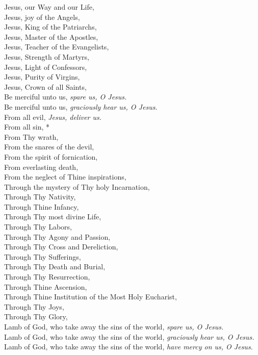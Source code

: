 \documentclass{article}
\begin{document}
\begin{multicols}{3}
Jesus, our Way and our Life,\\ 
Jesus, joy of the Angels,\\
Jesus, King of the Patriarchs,\\ 
Jesus, Master of the Apostles,\\
Jesus, Teacher of the Evangelists,\\ 
Jesus, Strength of Martyrs,\\
Jesus, Light of Confessors,\\
Jesus, Purity of Virgins,\\
Jesus, Crown of all Saints,\\
Be merciful unto us, \textit{spare us, O Jesus.}\\
Be merciful unto us, \textit{graciously hear us, O Jesus.}\\
From all evil, \textit{Jesus, deliver us.}\\
From all sin, *\\
From Thy wrath,\\
From the snares of the devil,\\
From the spirit of fornication,\\
From everlasting death,\\
From the neglect of Thine inspirations,\\
Through the mystery of Thy holy Incarnation,\\
Through Thy Nativity,\\
Through Thine Infancy,\\
Through Thy most divine Life,\\
Through Thy Labors,\\
Through Thy Agony and Passion,\\
Through Thy Cross and Dereliction,\\
Through Thy Sufferings,\\
Through Thy Death and Burial,\\
Through Thy Resurrection,\\
Through Thine Ascension,\\
Through Thine Institution of the Most Holy Eucharist,\\
Through Thy Joys,\\
Through Thy Glory,\\
Lamb of God, who take away the sins of the world, \textit{spare us, O Jesus.}\\
Lamb of God, who take away the sins of the world, \textit{graciously hear us, O Jesus.}\\
Lamb of God, who take away the sins of the world, \textit{have mercy on us, O Jesus.}\\

\end{multicols}
\end{document}
